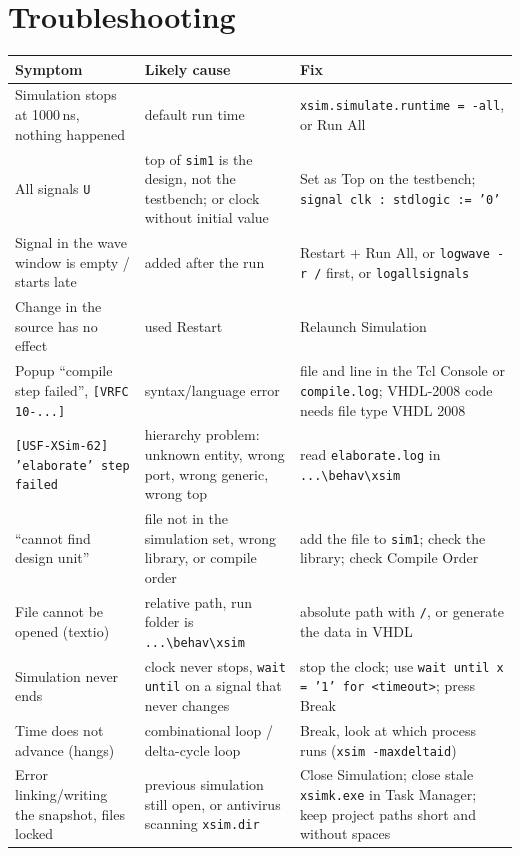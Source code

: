 \documentclass[11pt,a4paper]{article}
\newcommand{\code}[1]{\texttt{#1}}
\newcommand{\bs}{\textbackslash\allowbreak{}}
\renewcommand{\_}{\oldunderscore\allowbreak{}}
\newcommand{\menu}[1]{\textsf{#1}}
\begin{document}
\section{Troubleshooting}\label{sec:trouble}
\begin{longtable}{@{}p{4.4cm}p{4.6cm}p{6cm}@{}}
\toprule
\textbf{Symptom} & \textbf{Likely cause} & \textbf{Fix} \\
\midrule
\endhead
Simulation stops at 1000\,ns, nothing happened & default run time & \code{xsim.simulate.runtime = -all}, or \menu{Run All} \\
All signals \code{U} & top of \code{sim\_1} is the design, not the testbench; or clock without initial value & \menu{Set as Top} on the testbench; \code{signal clk : std\_logic := '0'} \\
Signal in the wave window is empty / starts late & added after the run & \menu{Restart} + \menu{Run All}, or \code{log\_wave -r /} first, or \code{log\_all\_signals} \\
Change in the source has no effect & used \menu{Restart} & \menu{Relaunch Simulation} \\
Popup ``compile step failed'', \code{[VRFC 10-...]} & syntax/language error & file and line in the Tcl Console or \code{compile.log}; VHDL-2008 code needs file type VHDL 2008 \\
\code{[USF-XSim-62] 'elaborate' step failed} & hierarchy problem: unknown entity, wrong port, wrong generic, wrong top & read \code{elaborate.log} in \code{...\bs behav\bs xsim} \\
``cannot find design unit'' & file not in the simulation set, wrong library, or compile order & add the file to \code{sim\_1}; check the library; check \menu{Compile Order} \\
File cannot be opened (textio) & relative path, run folder is \code{...\bs behav\bs xsim} & absolute path with \code{/}, or generate the data in VHDL \\
Simulation never ends & clock never stops, \code{wait until} on a signal that never changes & stop the clock; use \code{wait until x = '1' for <timeout>}; press \menu{Break} \\
Time does not advance (hangs) & combinational loop / delta-cycle loop & \menu{Break}, look at which process runs (\code{xsim -maxdeltaid}) \\
Error linking/writing the snapshot, files locked & previous simulation still open, or antivirus scanning \code{xsim.dir} & \menu{Close Simulation}; close stale \code{xsimk.exe} in Task Manager; keep project paths short and without spaces \\

\end{longtable}
\end{document}
